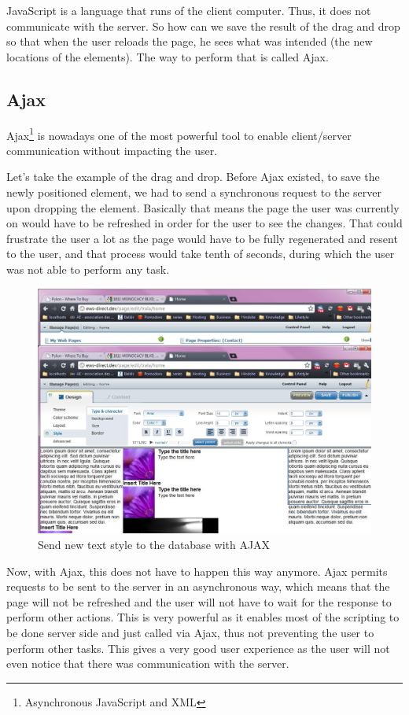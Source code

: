 JavaScript is a language that runs of the client computer. Thus, it does not communicate with the server. So how can we save the result of the drag and drop so that when the user reloads the page, he sees what was intended (the new locations of the elements). The way to perform that is called Ajax.

\subsection{Ajax}

Ajax\footnote{Asynchronous JavaScript and XML} is nowadays one of the most powerful tool to enable client/server communication without impacting the user. 

Let's take the example of the drag and drop. Before Ajax existed, to save the newly positioned element, we had to send a synchronous request to the server upon dropping the element. Basically that means the page the user was currently on would have to be refreshed in order for the user to see the changes. That could frustrate the user a lot as the page would have to be fully regenerated and resent to the user, and that process would take tenth of seconds, during which the user was not able to perform any task. 

\begin{figure}[h!]
\centering
\includegraphics[width=.55\textwidth]{img/ews_toolbar_text.jpg}
\caption{Send new text style to the database with AJAX}
\label{figure:ews_archi_before}
\end{figure}

Now, with Ajax, this does not have to happen this way anymore. Ajax permits requests to be sent to the server in an asynchronous way, which means that the page will not be refreshed and the user will not have to wait for the response to perform other actions. This is very powerful as it enables most of the scripting to be done server side and just called via Ajax, thus not preventing the user to perform other tasks. This gives a very good user experience as the user will not even notice that there was communication with the server.

